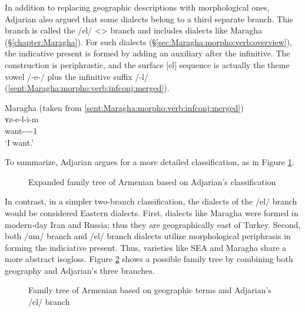 In addition to replacing geographic descriptions with morphological ones, Adjarian also argued that some dialects belong to a third separate branch. This branch is called the /el/ <> branch and includes dialects like Maragha (\S\ref{chapter:Maragha}). For such dialects (\S\ref{sec:Maragha:morpho:verb:overview}), the indicative present is formed by adding an auxiliary after the infinitive. The construction is periphrastic, and the surface [el] sequence is actually the theme vowel /-e-/ plus the infinitive suffix /-l/ (\ref{sent:Maragha:morpho:verb:infconj:merged}). 

\begin{exe}
		\ex Maragha (taken from \ref{sent:Maragha:morpho:verb:infconj:merged})
\\
	 \gll ʏz-e-l-i-m \\
			want-{\thgloss}-{\infgloss}-{\aux}-1{\sg} \\
			\trans `I want.'\\
			 \label{sent:Maragha:morpho:verb:infconj:merged REP in intro} 
			
	
\end{exe}

To summarize, Adjarian argues for a more detailed classification, as in Figure \ref{tree:dialect:adj}. 

\begin{figure}[H]
	\caption{Expanded family tree of Armenian based on Adjarian's classification}
	\label{tree:dialect:adj}
\end{figure}

In contrast, in a simpler two-branch classification, the dialects of the /el/ branch would be considered Eastern dialects. First, dialects like Maragha were formed in modern-day Iran and Russia; thus they are geographically east of Turkey. Second, both /um/ branch and /el/ branch dialects utilize morphological periphrasis in forming the indiciative present. Thus, varieties like SEA and Maragha share a more abstract isogloss. Figure \ref{tree:dialect:compromise} shows a possible family tree by combining both geography and Adjarian's three branches. 

\begin{figure}[H]
	\caption{Family tree of Armenian based on geographic terms and Adjarian's /el/ branch}
	\label{tree:dialect:compromise}
\end{figure}
 
